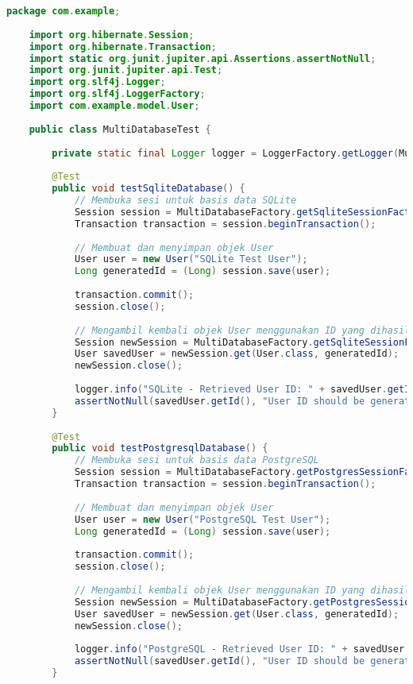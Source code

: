 \begin{lstlisting}[language=Java, style=JavaStyle]
	package com.example;
	
	import org.hibernate.Session;
	import org.hibernate.Transaction;
	import static org.junit.jupiter.api.Assertions.assertNotNull;
	import org.junit.jupiter.api.Test;
	import org.slf4j.Logger;
	import org.slf4j.LoggerFactory;
	import com.example.model.User;
	
	public class MultiDatabaseTest {
		
		private static final Logger logger = LoggerFactory.getLogger(MultiDatabaseTest.class);
		
		@Test
		public void testSqliteDatabase() {
			// Membuka sesi untuk basis data SQLite
			Session session = MultiDatabaseFactory.getSqliteSessionFactory().openSession();
			Transaction transaction = session.beginTransaction();
			
			// Membuat dan menyimpan objek User
			User user = new User("SQLite Test User");
			Long generatedId = (Long) session.save(user);
			
			transaction.commit();
			session.close();
			
			// Mengambil kembali objek User menggunakan ID yang dihasilkan
			Session newSession = MultiDatabaseFactory.getSqliteSessionFactory().openSession();
			User savedUser = newSession.get(User.class, generatedId);
			newSession.close();
			
			logger.info("SQLite - Retrieved User ID: " + savedUser.getId());
			assertNotNull(savedUser.getId(), "User ID should be generated in SQLite");
		}
		
		@Test
		public void testPostgresqlDatabase() {
			// Membuka sesi untuk basis data PostgreSQL
			Session session = MultiDatabaseFactory.getPostgresSessionFactory().openSession();
			Transaction transaction = session.beginTransaction();
			
			// Membuat dan menyimpan objek User
			User user = new User("PostgreSQL Test User");
			Long generatedId = (Long) session.save(user);
			
			transaction.commit();
			session.close();
			
			// Mengambil kembali objek User menggunakan ID yang dihasilkan
			Session newSession = MultiDatabaseFactory.getPostgresSessionFactory().openSession();
			User savedUser = newSession.get(User.class, generatedId);
			newSession.close();
			
			logger.info("PostgreSQL - Retrieved User ID: " + savedUser.getId());
			assertNotNull(savedUser.getId(), "User ID should be generated in PostgreSQL");
		}
		

\end{lstlisting}
